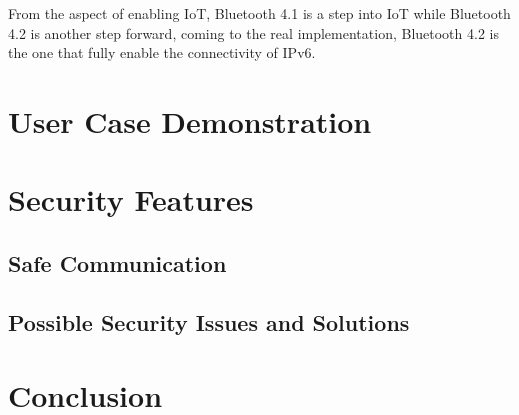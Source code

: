 \documentclass{cseminar}
\begin{document}
From the aspect of enabling IoT, Bluetooth 4.1 is a step into IoT while Bluetooth 4.2 is another step forward, coming to the real implementation, Bluetooth 4.2 is the one that fully enable the connectivity of IPv6.
\section{User Case Demonstration}


\section{Security Features}

\subsection{Safe Communication}

\subsection{Possible Security Issues and Solutions}
\section{Conclusion}





\end{document}
